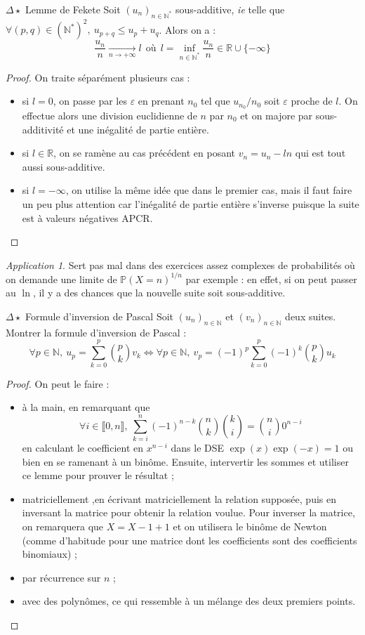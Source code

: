 \documentclass[french,a4paper]{article}
\renewcommand{\P}{\mathbb{P}}
\newcommand{\N}{\mathbb{N}}
\newcommand{\R}{\mathbb{R}}
\newcommand{\st}{^*}
\theoremstyle{plain}
\theoremstyle{definition}
\theoremstyle{remark}
\newtheorem*{app}{Application}
\begin{document}
\begin{ex}[Moulin.04]{$\Delta\star$ Lemme de Fekete}
	Soit $(u_n)_{n\in\N\st}$ sous-additive, \textit{ie} telle que $\forall(p,q)\in(\N\st)^2,\ u_{p+q}\leqslant u_p+u_q$. Alors on a : $$\frac{u_n}{n}\xrightarrow[n\to+\infty]{}l \ \ \text{où} \ \ l=\inf_{n\in\N\st}\frac{u_n}{n}\in\R\cup\{-\infty\}$$
\end{ex}
\begin{proof}
	On traite séparément plusieurs cas :
	\begin{itemize}
		\item si $l=0$, on passe par les $\varepsilon$ en prenant $n_0$ tel que $u_{n_0}/n_0$ soit $\varepsilon$ proche de $l$. On effectue alors une division euclidienne de $n$ par $n_0$ et on majore par sous-additivité et une inégalité de partie entière.
		\item si $l\in\R$, on se ramène au cas précédent en posant $v_n=u_n-ln$ qui est tout aussi sous-additive.
		\item si $l=-\infty$, on utilise la même idée que dans le premier cas, mais il faut faire un peu plus attention car l'inégalité de partie entière s'inverse puisque la suite est à valeurs négatives APCR.
	\end{itemize}
\end{proof}
\begin{app}
	Sert pas mal dans des exercices assez complexes de probabilités où on demande une limite de $\P(X=n)^{1/n}$ par exemple : en effet, si on peut passer au $\ln$, il y a des chances que la nouvelle suite soit sous-additive.
\end{app}

\begin{ex}{$\Delta\star$ Formule d'inversion de Pascal}
	Soit $(u_n)_{n\in\N}$ et $(v_n)_{n\in\N}$ deux suites. Montrer la formule d'inversion de Pascal : $$\forall p\in\N,\ u_p=\sum_{k=0}^{p}\binom{p}{k}v_k \iff \forall p\in\N,\ v_p=(-1)^p\sum_{k=0}^{p}(-1)^k\binom{p}{k}u_k$$
\end{ex}
\begin{proof}
	On peut le faire :
	\begin{itemize}
		\item à la main, en remarquant que $$\forall i\in\llbracket0,n\rrbracket,\ \sum_{k=i}^{n}(-1)^{n-k}\binom{n}{k}\binom{k}{i}=\binom{n}{i}0^{n-i}$$ en calculant le coefficient en $x^{n-i}$ dans le DSE $\exp(x)\exp(-x)=1$ ou bien en se ramenant à un binôme. Ensuite, intervertir les sommes et utiliser ce lemme pour prouver le résultat ;
		\item matriciellement ,en écrivant matriciellement la relation supposée, puis en inversant la matrice pour obtenir la relation voulue. Pour inverser la matrice, on remarquera que $X=X-1+1$ et on utilisera le binôme de Newton (comme d'habitude pour une matrice dont les coefficients sont des coefficients binomiaux) ;
		\item par récurrence sur $n$ ;
		\item avec des polynômes, ce qui ressemble à un mélange des deux premiers points.
	\end{itemize}
\end{proof}
\end{document}
